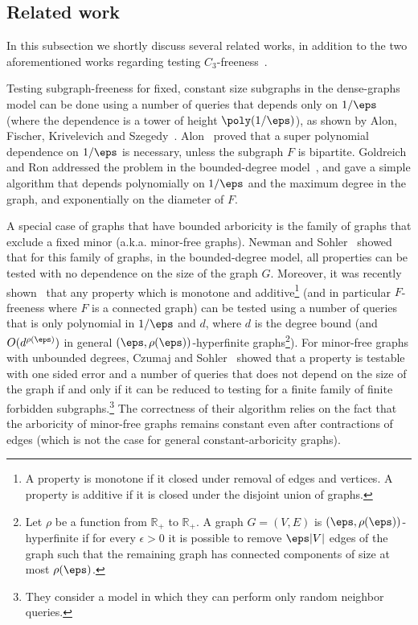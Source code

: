 

\subsection{Related work}\label{subsec:related}
In this subsection we shortly discuss several related works, in addition to the two aforementioned works regarding testing $C_3$-freeness~\cite{AKKR08,Reut}.

Testing subgraph-freeness for fixed, constant size subgraphs in the dense-graphs model can be done using a number of queries that depends only on $1/\eps$ (where the dependence is a tower of height $\poly(1/\eps)$), as shown by Alon, Fischer, Krivelevich and Szegedy~\cite{AFKS00}.  Alon~\cite{Alo02} proved that a super polynomial dependence on $1/\eps$ is necessary, unless the subgraph $F$ is bipartite. Goldreich and Ron addressed the problem in the bounded-degree model~\cite{GR-bound}, and gave a simple algorithm that depends polynomially on $1/\eps$ and the maximum degree in the graph, and exponentially on the diameter of $F$.

A special case of graphs that have bounded arboricity is the family of graphs that exclude a fixed minor (a.k.a. minor-free graphs).
Newman and Sohler~\cite{NS13} showed that 
for this family of graphs, in the bounded-degree model, all properties 
can be tested with no dependence on the size of the graph $G$. Moreover, it was recently shown~\cite{SS21,LS21} that any property which is monotone and additive\footnote{A property is monotone if it closed under removal of edges and vertices. A property is 
additive if it is closed under the disjoint union of graphs.} (and in particular $F$-freeness where $F$ is a connected graph) can be tested using a number of queries that is only polynomial in $1/\eps$ and $d$, where $d$ is the degree bound (and $O(d^{\rho(\eps)})$ in general $(\eps, \rho(\eps))$-hyperfinite graphs\footnote{Let $\rho$ be a function from $\mathbb{R}_+$ to $\mathbb{R}_+$. A graph $G = (V, E)$ is $(\eps, \rho(\eps))$-hyperfinite if for every $\epsilon > 0$ it is possible to
remove $\eps |V|$ edges of the graph such that the remaining graph has connected components of size at most $\rho(\eps)$.}).
For minor-free graphs with unbounded degrees, Czumaj and Sohler~\cite{CS19} showed that a property is testable 
with one sided error and a number of queries that does not depend on the size of the graph if and only if it can be reduced to testing for a finite family of finite forbidden subgraphs.\footnote{They consider a model in which they can perform only random neighbor queries.} The correctness of their algorithm relies on the fact that the arboricity of minor-free graphs remains constant even after contractions of edges (which is not the case for general constant-arboricity graphs). 

